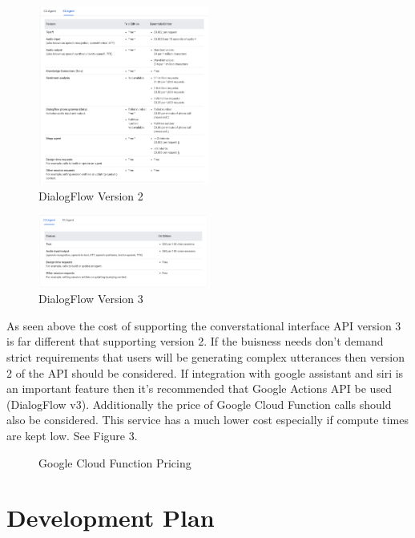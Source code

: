 \documentclass[9pt,software]{livecoms}
\begin{document}
\begin{figure}
  \caption{DialogFlow Version 2}
  \centering
    \includegraphics[width=0.5\textwidth]{ESAgent.PNG}
\end{figure}

\begin{figure}
  \caption{DialogFlow Version 3}
  \centering
    \includegraphics[width=0.5\textwidth]{CX_Agent.PNG}
\end{figure}

As seen above the cost of supporting the converstational interface API version 3 is far different that supporting version 2. If the buisness needs don't demand strict requirements 
that users will be generating complex utterances then version 2 of the API should be considered. If integration with google assistant and siri is an important feature then it's recommended
that Google Actions API be used (DialogFlow v3). Additionally the price of Google Cloud Function calls should also be considered. This service has a much lower cost especially if compute times
are kept low. See Figure 3.

\begin{figure}
  \caption{Google Cloud Function Pricing}
  \centering
\end{figure}

\section{Development Plan}
\end{document}
